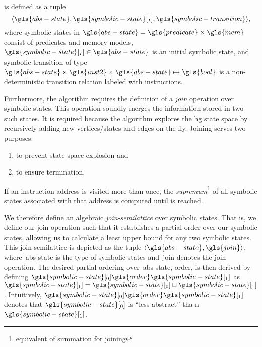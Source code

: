 \begin{definition}
   is defined as a tuple
  \begin{equation*}
    \langle\gls{abs-state}, \gls{symbolic-state}[_I], \gls{symbolic-transition}\rangle,
  \end{equation*}
  where symbolic states in $\gls{abs-state}=\gls{predicate}\times\gls{mem}$ consist of predicates and memory models, $\gls{symbolic-state}[_I] \in \gls{abs-state}$ is an initial symbolic state, and \gls{symbolic-transition} of type $\gls{abs-state} \times \gls{inst2}\times\gls{abs-state}\mapsto\gls{bool}$ is a non-deterministic transition relation labeled with instructions.
\end{definition}

Furthermore, the algorithm requires the definition of a \emph{join} operation over symbolic states.
This operation soundly merges the information stored in two such states.
It is required because the algorithm explores the \ac{hg} state space by recursively adding new vertices/states and edges on the fly.
Joining serves two purposes:
\begin{enumerate}
  \item to prevent state space explosion and
  \item to ensure termination.
\end{enumerate}
If an instruction address is visited more than once,
the \emph{supremum}\footnote{equivalent of summation for joining}
of all symbolic states associated with that address
is computed until  is reached.

We therefore define an algebraic \emph{join-semilattice}
over symbolic states.
That is, we define our join operation
such that it establishes a partial order over our symbolic states,
allowing us to calculate a least upper bound for any two symbolic states.
This join-semilattice is depicted as the tuple $\langle\gls{abs-state},\gls{join}\rangle$,
where~\gls{abs-state} is the type of symbolic states
and~\gls{join} denotes the join operation.
The desired partial ordering over~\gls{abs-state}, \gls{order}, is then derived
by defining $\gls{symbolic-state}[_0] \gls{order} \gls{symbolic-state}[_1]$ as $\gls{symbolic-state}[_1] = \gls{symbolic-state}[_0] \sqcup \gls{symbolic-state}[_1]$.
Intuitively, $\gls{symbolic-state}[_0] \gls{order} \gls{symbolic-state}[_1]$ denotes that $\gls{symbolic-state}[_0]$ is ``less abstract'' tha	n $\gls{symbolic-state}[_1]$.

